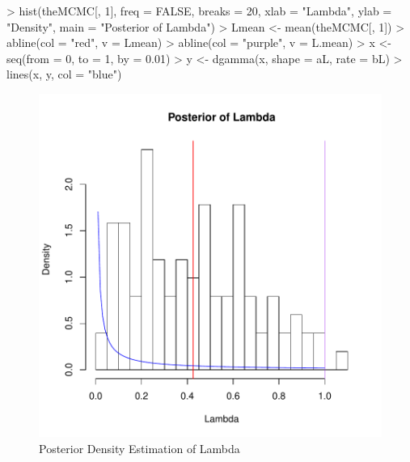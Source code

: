 \documentclass[12pt]{article}
\begin{document}
\begin{Schunk}
\begin{Sinput}
> hist(theMCMC[, 1], freq = FALSE, breaks = 20, xlab = "Lambda", 
     ylab = "Density", main = "Posterior of Lambda")
> Lmean <- mean(theMCMC[, 1])
> abline(col = "red", v = Lmean)
> abline(col = "purple", v = L.mean)
> x <- seq(from = 0, to = 1, by = 0.01)
> y <- dgamma(x, shape = aL, rate = bL)
> lines(x, y, col = "blue")
\end{Sinput}
\end{Schunk}
\begin{figure}
  \begin{center}
\includegraphics{BD_MCMC-lambdaPlot}
\end{center}
\caption{Posterior Density Estimation of Lambda}
\label{fig:lambdaPosterior}
\end{figure}
\end{document}
